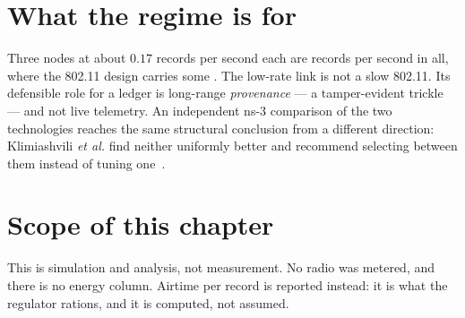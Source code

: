 \section{What the regime is for}

Three nodes at about $0.17$ records per second each are \loraAgg{} records per second in all,
where the 802.11 design carries some \wifiAgg. The low-rate link is not a slow 802.11. Its
defensible role for a ledger is long-range \emph{provenance} --- a tamper-evident trickle --- and
not live telemetry. An independent ns-3 comparison of the two technologies reaches the same
structural conclusion from a different direction: Klimiashvili \emph{et al.} find neither
uniformly better and recommend selecting between them instead of tuning
one~\cite{klimiashvili2020loravswifi}.

\section{Scope of this chapter}

This is simulation and analysis, not measurement. No radio was metered, and there is no energy
column. Airtime per record is reported instead: it is what the regulator rations, and it is
computed, not assumed.

